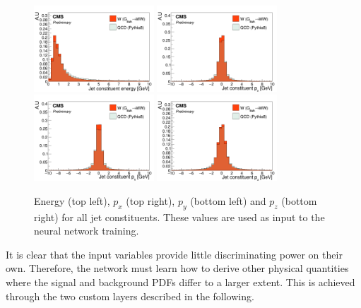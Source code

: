 \begin{figure}[h!]
\centering
\includegraphics[width=0.4\textwidth]{figures/vtagging/AN-18-099/input/inputs/sig-bkg/pe.png}
\includegraphics[width=0.4\textwidth]{figures/vtagging/AN-18-099/input/inputs/sig-bkg/ppx.png}\\
\includegraphics[width=0.4\textwidth]{figures/vtagging/AN-18-099/input/inputs/sig-bkg/ppy.png}
\includegraphics[width=0.4\textwidth]{figures/vtagging/AN-18-099/input/inputs/sig-bkg/ppz.png}
\caption{Energy (top left), $p_x$ (top right), $p_y$ (bottom left) and $p_z$ (bottom right) for all jet constituents. These values are used as input to the neural network training.}
\label{fig:lola:inputs}
\end{figure}
It is clear that the input variables provide little discriminating power on their own. Therefore, the network must learn how to derive other physical quantities where the signal and background PDFs differ to a larger extent. This is achieved through the two custom layers described in the following.

